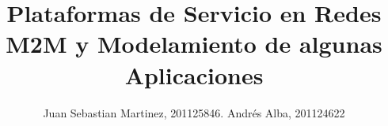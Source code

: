 \documentclass[journal]{IEEEtran}
\begin{document}
%
\title{Plataformas de Servicio en Redes M2M y Modelamiento de algunas Aplicaciones}
%
%
%

\author{Juan Sebastian Martinez, 201125846. Andrés Alba, 201124622}%
% 
%



%
{}
% 




\end{document}
